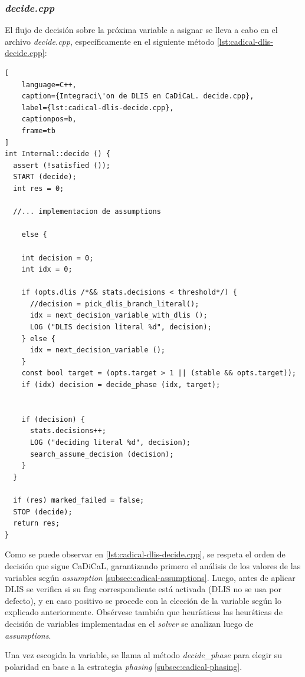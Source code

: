 \subsubsection{\textit{decide.cpp}}
El flujo de decisi\'on sobre la pr\'oxima variable a asignar se lleva a cabo en el archivo \textit{decide.cpp}, espec\'ificamente en el siguiente m\'etodo \ref{lst:cadical-dlis-decide.cpp}:

\begin{lstlisting}[
    language=C++,
    caption={Integraci\'on de DLIS en CaDiCaL. decide.cpp},
    label={lst:cadical-dlis-decide.cpp},
    captionpos=b,
    frame=tb
]
int Internal::decide () {
  assert (!satisfied ());
  START (decide);
  int res = 0;

  //... implementacion de assumptions

    else {

    int decision = 0;
    int idx = 0;
    
    if (opts.dlis /*&& stats.decisions < threshold*/) {
      //decision = pick_dlis_branch_literal();
      idx = next_decision_variable_with_dlis ();
      LOG ("DLIS decision literal %d", decision);
    } else {
      idx = next_decision_variable ();
    }
    const bool target = (opts.target > 1 || (stable && opts.target));
    if (idx) decision = decide_phase (idx, target);
    

    if (decision) {
      stats.decisions++;
      LOG ("deciding literal %d", decision);
      search_assume_decision (decision);
    }
  }

  if (res) marked_failed = false;
  STOP (decide);
  return res;
}

\end{lstlisting}

Como se puede observar en \ref{lst:cadical-dlis-decide.cpp}, se respeta el orden de decisi\'on que sigue CaDiCaL, garantizando primero el an\'alisis de los valores de las variables seg\'un \textit{assumption} \ref{subsec:cadical-assumptions}. Luego, antes de aplicar DLIS se verifica si su flag correspondiente est\'a activada (DLIS no se usa por defecto), y en caso positivo se procede con la elecci\'on de la variable seg\'un lo explicado anteriormente. Obs\'ervese tambi\'en que heur\'isticas las heur\'sticas de decisi\'on de variables implementadas en el \textit{solver} se analizan luego de \textit{assumptions}.

Una vez escogida la variable, se llama al m\'etodo \textit{decide\_phase} para elegir su polaridad en base a la estrategia \textit{phasing} \ref{subsec:cadical-phasing}.

